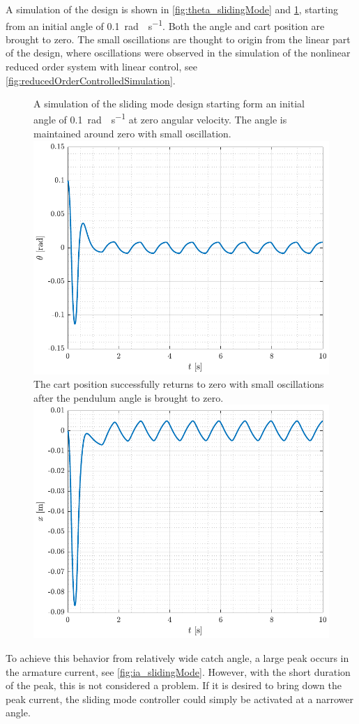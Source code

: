 A simulation of the design is shown in \autoref{fig:theta_slidingMode} and \ref{fig:x_slidingMode}, starting from an initial angle of \SI{0.1}{rad \cdot s^{-1}}. Both the angle and cart position are brought to zero. The small oscillations are thought to origin from the linear part of the design, where oscillations were observed in the simulation of the nonlinear reduced order system with linear control, see \autoref{fig:reducedOrderControlledSimulation}.
%
\begin{figure}[H]
  \hspace{-10pt}
  \captionbox
  {
    A simulation of the sliding mode design starting form an initial angle of \SI{0.1}{rad \cdot s^{-1}} at zero angular velocity. The angle is maintained around zero with small oscillation.
    \label{fig:theta_slidingMode}
  }
  {
    \hspace{-1cm}
    \includegraphics[width=.4\textwidth]{figures/theta_slidingMode}
  }
  \hspace{20pt}
  \captionbox 
  {
    The cart position successfully returns to zero with small oscillations after the pendulum angle is brought to zero.
    \label{fig:x_slidingMode}
  }
  {
    \hspace{-1cm}
    \includegraphics[width=.4\textwidth]{figures/x_slidingMode}
  }  
\end{figure}
%
To achieve this behavior from relatively wide catch angle, a large peak occurs in the armature current, see \autoref{fig:ia_slidingMode}. However, with the short duration of the peak, this is not considered a problem. If it is desired to bring down the peak current, the sliding mode controller could simply be activated at a narrower angle.
